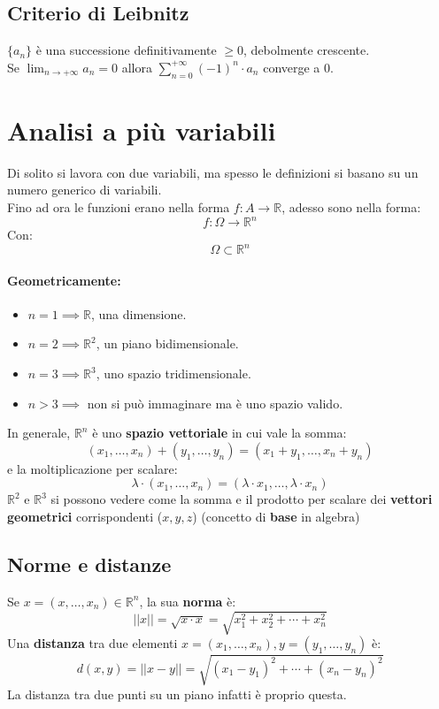 \documentclass[12pt,a4paper]{article}
\let\oldsection\section
\renewcommand{\section}{\clearpage\oldsection}
\begin{document}
\subsection{Criterio di Leibnitz}
$\{a_n\}$ è una successione definitivamente $\geq 0$, debolmente crescente.\\
Se $\lim_{n \to +\infty} a_n = 0$ allora $\sum_{n=0}^{+\infty} (-1)^n \cdot a_n$ converge a $0$.

\section{Analisi a più variabili}
Di solito si lavora con due variabili, ma spesso le definizioni si basano su un numero generico di variabili.\\
Fino ad ora le funzioni erano nella forma $f:A \to \mathbb{R}$, adesso sono nella forma:
\[
f:\Omega \to \mathbb{R}^n
\]
Con:
\[
\Omega \subset \mathbb{R}^n
\]
\paragraph{Geometricamente:}
\begin{itemize}
  \item $n = 1 \implies \mathbb{R}$, una dimensione.
  \item $n = 2 \implies \mathbb{R}^2$, un piano bidimensionale.
  \item $n = 3 \implies \mathbb{R}^3$, uno spazio tridimensionale.
  \item $n > 3 \implies $ non si può immaginare ma è uno spazio valido.
\end{itemize}
In generale, $\mathbb{R}^n$ è uno \textbf{spazio vettoriale} in cui vale la somma:
\[
(x_1,\ldots,x_n) + (y_1,\ldots,y_n) = (x_1 + y_1, \ldots, x_n + y_n)
\]
e la moltiplicazione per scalare:
\[
\lambda \cdot (x_1,\ldots,x_n) = (\lambda \cdot x_1,\ldots, \lambda \cdot x_n)
\]
$\mathbb{R}^2$ e $\mathbb{R}^3$ si possono vedere come la somma e il prodotto per scalare dei \textbf{vettori geometrici} corrispondenti ($x,y,z$) (concetto di \textbf{base} in algebra)
\subsection{Norme e distanze}
Se $x = (x,\ldots,x_n) \in \mathbb{R}^n$, la sua \textbf{norma} è:
\[
||x|| = \sqrt{x \cdot x} = \sqrt{x_1^2 + x_2^2 + \cdots + x_n^2}
\]
Una \textbf{distanza} tra due elementi $x = (x_1,\ldots,x_n), y = (y_1,\ldots,y_n)$ è:
\[
d(x,y) = ||x-y|| =\sqrt{(x_1 - y_1)^2 + \cdots + (x_n - y_n)^2}
\]
La distanza tra due punti su un piano infatti è proprio questa.\\\\
\end{document}
